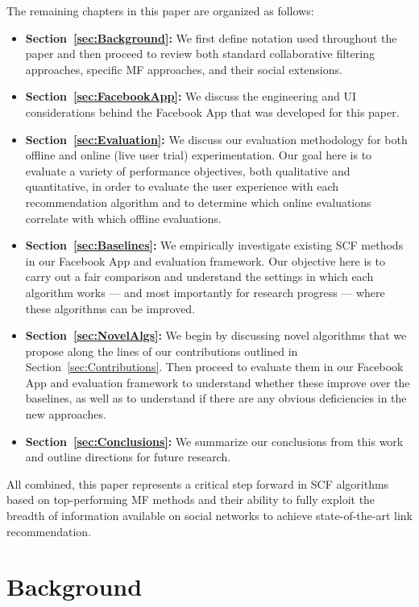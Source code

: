 \documentclass{sig-alternate}
\begin{document}
The remaining chapters in this paper are organized as follows:
\begin{itemize}
\item {\bf Section~\ref{sec:Background}:} We first define notation
used throughout the paper and then proceed to review both standard
collaborative filtering approaches, specific MF approaches, and
their social extensions.
\item {\bf Section~\ref{sec:FacebookApp}:} We discuss the engineering
and UI considerations behind the Facebook App that was developed for this
paper.
\item {\bf Section~\ref{sec:Evaluation}:} We discuss our evaluation
methodology for both offline and online (live user trial) experimentation.
Our goal here is to evaluate a variety of performance objectives,
both qualitative and quantitative, in order to evaluate the user
experience with each recommendation algorithm and to determine
which online evaluations correlate with which offline evaluations.
\item {\bf Section~\ref{sec:Baselines}:} We empirically investigate 
existing SCF methods in our Facebook App and evaluation framework.
Our objective here is to carry out a fair comparison and understand
the settings in which each algorithm works --- and most importantly
for research progress --- where these algorithms can be improved.
\item {\bf Section~\ref{sec:NovelAlgs}:} We begin by discussing novel
algorithms that we propose along the lines of our contributions
outlined in Section~\ref{sec:Contributions}.  Then proceed to evaluate
them in our Facebook App and evaluation framework to understand
whether these improve over the baselines, as well as to understand
if there are any obvious deficiencies in the new approaches.
\item {\bf Section~\ref{sec:Conclusions}:} We summarize our conclusions
from this work and outline directions for future research.
\end{itemize}

All combined, this paper represents a critical step forward in SCF
algorithms based on top-performing MF methods and their ability to
fully exploit the breadth of information available on social networks
to achieve state-of-the-art link recommendation.

\section{Background}
\end{document}
